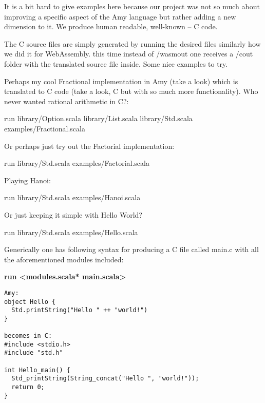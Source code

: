 
It is a bit hard to give examples here because our project was not so much about improving a specific aspect of the Amy language but rather adding a new dimension to it. We produce human readable, well-known -- C code.

The C source files are simply generated by running the desired files similarly how we did it for WebAssembly. this time instead of /wasmout one receives a /cout folder with the translated source file inside. Some nice examples to try.

Perhaps my cool Fractional implementation in Amy (take a look) which is translated to C code (take a look, C but with so much more functionality). Who never wanted rational arithmetic in C?:

run library/Option.scala library/List.scala library/Std.scala examples/Fractional.scala

Or perhaps just try out the Factorial implementation:

run library/Std.scala examples/Factorial.scala

Playing Hanoi:

run library/Std.scala examples/Hanoi.scala

Or just keeping it simple with Hello World?

run library/Std.scala examples/Hello.scala

\bigskip

Generically one has following syntax for producing a C file called main.c with all the aforementioned modules included:

\textbf{run \textless modules.scala* main.scala\textgreater\space}

%
\newpage
\begin{lstlisting}
Amy:
object Hello {
  Std.printString("Hello " ++ "world!")
}

becomes in C:
#include <stdio.h>
#include "std.h"

int Hello_main() {
  Std_printString(String_concat("Hello ", "world!"));
  return 0;
}
\end{lstlisting}

